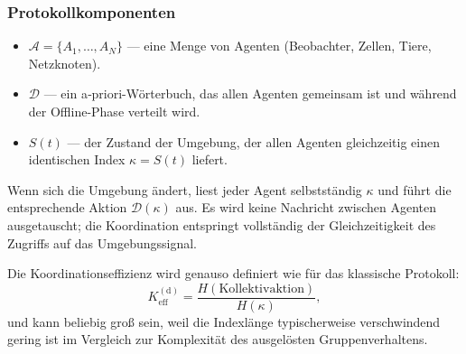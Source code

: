 \documentclass[11pt,a4paper]{article}
\begin{document}
	\subsubsection*{Protokollkomponenten}
	\begin{itemize}[leftmargin=*]
		\item $\mathcal{A} = \{A_1,\dots,A_N\}$ — eine Menge von Agenten (Beobachter, Zellen, Tiere, Netzknoten).
		\item $\mathcal{D}$ — ein a‑priori-Wörterbuch, das allen Agenten gemeinsam ist und während der Offline-Phase verteilt wird.
		\item $S(t)$ — der Zustand der Umgebung, der allen Agenten gleichzeitig einen identischen Index $\kappa = S(t)$ liefert.
	\end{itemize}
	Wenn sich die Umgebung ändert, liest jeder Agent selbstständig $\kappa$ und führt die entsprechende Aktion $\mathcal{D}(\kappa)$ aus.
	Es wird keine Nachricht zwischen Agenten ausgetauscht; die Koordination entspringt vollständig der Gleichzeitigkeit des Zugriffs auf das Umgebungssignal.
	
	Die Koordinationseffizienz wird genauso definiert wie für das klassische Protokoll:
	\[
	K_{\mathrm{eff}}^{\mathrm{(d)}} = \frac{H(\text{Kollektivaktion})}{H(\kappa)},
	\]
	und kann beliebig groß sein, weil die Indexlänge typischerweise verschwindend gering ist im Vergleich zur Komplexität des ausgelösten Gruppenverhaltens.
	
\end{document}
